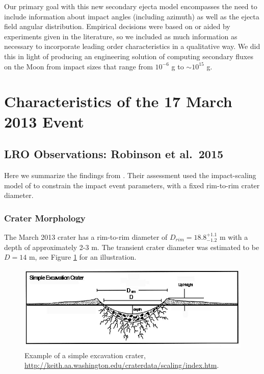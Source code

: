 \documentclass{hitec}
\numberwithin{equation}{section}
\begin{document}
Our primary goal with this new secondary ejecta model encompasses the need to include information about impact angles (including azimuth) as well as the ejecta field angular distribution. Empirical decisions were based on or aided by experiments given in the literature, so we included as much information as necessary to incorporate leading order characteristics in a qualitative way. We did this in light of producing an engineering solution of computing secondary fluxes on the Moon from impact sizes that range from $10^{-6}$ g to $\sim 10^{15}$ g.


\section{Characteristics of the 17 March 2013 Event}

\subsection{LRO Observations: Robinson et al.\ 2015}
Here we summarize the findings from \cite{robinson2015new}. Their assessment used the impact-scaling model of \cite{holsapple1993scaling} to constrain the impact event parameters, with a fixed rim-to-rim crater diameter.

\subsubsection{Crater Morphology}
The March 2013 crater has a rim-to-rim diameter of $D_{rim} = 18.8_{-1.2}^{+1.1}$ m with a depth of approximately 2-3 m. The transient crater diameter was estimated to be $D = 14$ m, see Figure \ref{fig:simpleExcavationCrater-Holsapple} for an illustration.
\begin{figure}[h!]
	\centering
	\includegraphics[scale=0.4]{simpleExcavationCrater-Holsapple.jpg}
	\caption{Example of a simple excavation crater, \url{http://keith.aa.washington.edu/craterdata/scaling/index.htm}.}\label{fig:simpleExcavationCrater-Holsapple}
\end{figure}
\end{document}
